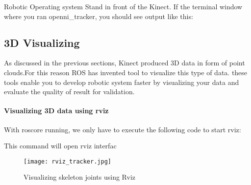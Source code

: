 \documentclass[a4paper]{book}
\begin{document}
\begin{chapter}{Robotic Operating system}
Stand in front of the Kinect. If the terminal window where you ran openni_tracker, you should see output like this:
\vspace{.5cm}
\newline


\subsection{3D Visualizing}
As discussed in the previous sections, Kinect produced 3D data in form of point clouds.For this reason ROS has invented tool to visualize this type of data.
these tools enable you to develop robotic system faster by visualizing your data and evaluate the quality of result for validation.
\paragraph{Visualizing 3D data using rviz}
With roscore running, we only have to execute the following code to start rviz:
\vspace{.5cm}
\newline
{}

\vspace{0.5cm}
This command will open rviz interfac
\begin{figure}[ht]
	\centering
	\caption{Visualizing skeleton joints using Rviz}
	\texttt{[image: rviz\_tracker.jpg]}
\end{figure}
	


\end{chapter}
\end{document}
